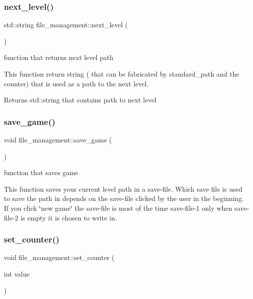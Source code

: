 \subsubsection{\texorpdfstring{next\+\_\+level()}{next\_level()}}
{\footnotesize\ttfamily std\+::string file\+\_\+management\+::next\+\_\+level (\begin{DoxyParamCaption}{ }\end{DoxyParamCaption})}



function that returns next level path 

This function return string ( that can be fabricated by standard\+\_\+path and the counter) that is used as a path to the next level.

\begin{DoxyReturn}{Returns}
std\+::string that contains path to next level 
\end{DoxyReturn}
\mbox{\label{classfile__management_a79e6ae7cec63aa959d7d0730d6ffa5a3}} 
\subsubsection{\texorpdfstring{save\+\_\+game()}{save\_game()}}
{\footnotesize\ttfamily void file\+\_\+management\+::save\+\_\+game (\begin{DoxyParamCaption}{ }\end{DoxyParamCaption})}



function that saves game 

This function saves your current level path in a save-\/file. Which save file is used to save the path in depends on the save-\/file clicked by the user in the beginning. If you click \char`\"{}new game\char`\"{} the save-\/file is most of the time save-\/file-\/1 only when save-\/file-\/2 is empty it is chosen to write in. \mbox{\label{classfile__management_a291475384add5bdb8002127c71c568ac}} 
\subsubsection{\texorpdfstring{set\+\_\+counter()}{set\_counter()}}
{\footnotesize\ttfamily void file\+\_\+management\+::set\+\_\+counter (\begin{DoxyParamCaption}\item[{int}]{value }\end{DoxyParamCaption})}



